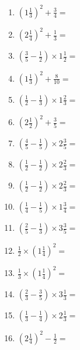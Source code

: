 \documentclass[12pt]{article}
\begin{document}
\begin{enumerate}
\item \large $ \left( 1 \frac{1}{3} \right)^2 + \frac{3}{4} = $ \vspace{1.6cm}
\item \large $ \left( 2 \frac{1}{4} \right)^2 + \frac{1}{3} = $ \vspace{1.6cm}
\item \large $ \left( \frac{3}{5} - \frac{1}{2} \right) \times 1 \frac{1}{2} = $ \vspace{1.6cm}
\item \large $ \left( 1 \frac{1}{3} \right)^2 + \frac{8}{10} = $ \vspace{1.6cm}
\item \large $ \left( \frac{1}{2} - \frac{1}{3} \right) \times 1 \frac{2}{3} = $ \vspace{1.6cm}
\item \large $ \left( 2 \frac{1}{2} \right)^2 + \frac{3}{5} = $ \vspace{1.6cm}
\item \large $ \left( \frac{4}{5} - \frac{1}{5} \right) \times 2 \frac{3}{5} = $ \vspace{1.6cm}
\item \large $ \left( \frac{1}{2} - \frac{1}{2} \right) \times 2 \frac{2}{3} = $ \vspace{1.6cm}
\item \large $ \left( \frac{1}{2} - \frac{1}{2} \right) \times 2 \frac{2}{3} = $ \vspace{1.6cm}
\item \large $ \left( \frac{1}{4} - \frac{1}{5} \right) \times 1 \frac{3}{4} = $ \vspace{1.6cm}
\newpage
\item \large $ \left( \frac{2}{5} - \frac{1}{3} \right) \times 3 \frac{3}{5} = $ \vspace{1.6cm}
\item \large $ \frac{1}{2} \times \left( 1 \frac{1}{4} \right)^2 = $ \vspace{1.6cm}
\item \large $ \frac{1}{3} \times \left( 1 \frac{1}{4} \right)^2 = $ \vspace{1.6cm}
\item \large $ \left( \frac{2}{3} - \frac{3}{5} \right) \times 3 \frac{1}{3} = $ \vspace{1.6cm}
\item \large $ \left( \frac{1}{3} - \frac{1}{4} \right) \times 2 \frac{1}{3} = $ \vspace{1.6cm}
\item \large $ \left( 2 \frac{1}{4} \right)^2 - \frac{1}{2} = $ \vspace{1.6cm}

\end{enumerate}
\end{document}
